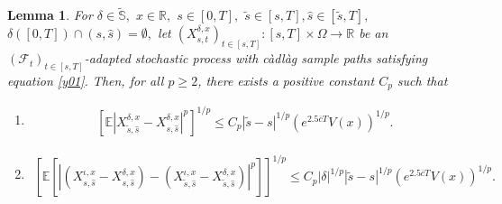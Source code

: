 \documentclass[11pt]{article}
\theoremstyle{theorem}
\newtheorem{Lem}[Def]{Lemma}
\theoremstyle{definition}
\newcommand{\bR}{\mathbb{R}}
\newcommand{\mf}{\mathcal{F}}
\newcommand{\1}{{\bf 1}}
\begin{document}
\begin{Lem}
\label{Lem3.5}
For $\delta \in \widetilde{\mathbb{S}},$ $x \in \bR,$ $s\in [0, T],$ $\widetilde{s} \in [s, T], \widehat{s} \in [\widetilde{s},T],$ $\delta([0, T])\cap (s, \widehat{s}) = \emptyset,$ let $(X^{\delta,x}_{s,t})_{t\in[s,T]}:[s,T]  \times\Omega\to\mathbb{R} $ 
be an $(\mf_t)_{t\in[s,T]}$-adapted stochastic process with c\`adl\`ag  sample paths satisfying equation \eqref{y01}. 
Then, for all $p \ge 2$, there exists a positive constant $C_p$ such that 
\begin{enumerate}
     \item [\textup{(i)}]
    \begin{align*}
        \left[\mathbb{E}\left|X^{\delta, x}_{\widetilde{s},\widehat{s}}-X^{\delta, x}_{s,\widehat{s}}\right|^p\right]^{1/p} 
 \leq C_p |\widetilde{s} -s|^{1/p} (e^{2.5\overline{c}T}V(x))^{1/p}. 
 \end{align*}
 \item [\textup{(ii)}]
 \begin{align*}
\left[\mathbb{E}\left[\left|\left(X^{\iota, x}_{s,\widehat{s}}-X^{\delta,x}_{s,\widehat{s}}\right) - \left(X^{\iota, x}_{\widetilde{s},\widehat{s}}-X^{\delta, x}_{\widetilde{s},\widehat{s}}\right)\right|^p\right]\right]^{1/p}  
   \leq C_p |\delta|^{1/p} |\widetilde{s} -s|^{1/p} (e^{2.5\overline{c}T}V(x))^{1/p}.
   \end{align*}
\end{enumerate}
\end{Lem}
\end{document}
